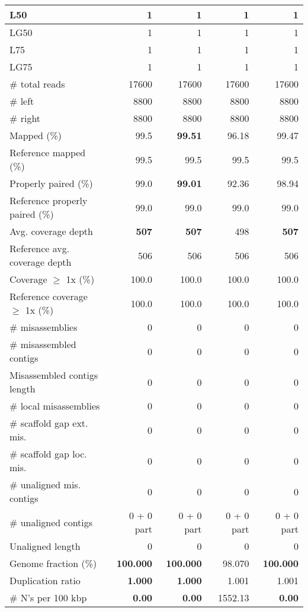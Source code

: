 \documentclass[12pt,a4paper]{article}
\begin{document}
\begin{table}[ht]
\begin{center}
\begin{tabular}{|l*{4}{|r}|}
L50 & 1 & 1 & 1 & 1 \\ \hline
LG50 & 1 & 1 & 1 & 1 \\ \hline
L75 & 1 & 1 & 1 & 1 \\ \hline
LG75 & 1 & 1 & 1 & 1 \\ \hline
\# total reads & 17600 & 17600 & 17600 & 17600 \\ \hline
\# left & 8800 & 8800 & 8800 & 8800 \\ \hline
\# right & 8800 & 8800 & 8800 & 8800 \\ \hline
Mapped (\%) & 99.5 & {\bf 99.51} & 96.18 & 99.47 \\ \hline
Reference mapped (\%) & 99.5 & 99.5 & 99.5 & 99.5 \\ \hline
Properly paired (\%) & 99.0 & {\bf 99.01} & 92.36 & 98.94 \\ \hline
Reference properly paired (\%) & 99.0 & 99.0 & 99.0 & 99.0 \\ \hline
Avg. coverage depth & {\bf 507} & {\bf 507} & 498 & {\bf 507} \\ \hline
Reference avg. coverage depth & 506 & 506 & 506 & 506 \\ \hline
Coverage $\geq$ 1x (\%) & 100.0 & 100.0 & 100.0 & 100.0 \\ \hline
Reference coverage $\geq$ 1x (\%) & 100.0 & 100.0 & 100.0 & 100.0 \\ \hline
\# misassemblies & 0 & 0 & 0 & 0 \\ \hline
\# misassembled contigs & 0 & 0 & 0 & 0 \\ \hline
Misassembled contigs length & 0 & 0 & 0 & 0 \\ \hline
\# local misassemblies & 0 & 0 & 0 & 0 \\ \hline
\# scaffold gap ext. mis. & 0 & 0 & 0 & 0 \\ \hline
\# scaffold gap loc. mis. & 0 & 0 & 0 & 0 \\ \hline
\# unaligned mis. contigs & 0 & 0 & 0 & 0 \\ \hline
\# unaligned contigs & 0 + 0 part & 0 + 0 part & 0 + 0 part & 0 + 0 part \\ \hline
Unaligned length & 0 & 0 & 0 & 0 \\ \hline
Genome fraction (\%) & {\bf 100.000} & {\bf 100.000} & 98.070 & {\bf 100.000} \\ \hline
Duplication ratio & {\bf 1.000} & {\bf 1.000} & 1.001 & 1.001 \\ \hline
\# N's per 100 kbp & {\bf 0.00} & {\bf 0.00} & 1552.13 & {\bf 0.00} \\ \hline

\end{tabular}
\end{center}
\end{table}
\end{document}
